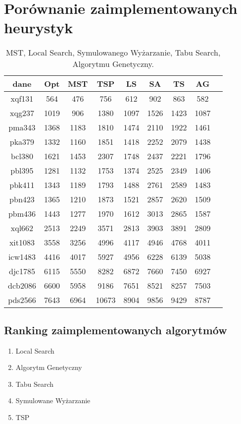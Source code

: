 \documentclass{article}
\begin{document}
\section{Porównanie zaimplementowanych heurystyk}
\begin{table}[h!]
    \centering
    \begin{tabular}{|c|c|c|c|c|c|c|c|c|}
        \hline
        dane & Opt & MST & TSP & LS & SA & TS & AG \\
        \hline
        xqf131 & 564 & 476 & 756 & 612 & 902 & 863 & 582 \\
        \hline
        xqg237 & 1019 & 906 & 1380 & 1097 & 1526 & 1423 & 1087 \\
        \hline
        pma343 & 1368 & 1183 & 1810 & 1474 & 2110 & 1922 & 1461 \\
        \hline
        pka379 & 1332 & 1160 & 1851 & 1418 & 2252 & 2079 & 1438 \\
        \hline
        bcl380 & 1621 & 1453 & 2307 & 1748 & 2437 & 2221 & 1796 \\
        \hline
        pbl395 & 1281 & 1132 & 1753 & 1374 & 2525 & 2349 & 1406 \\
        \hline
        pbk411 & 1343 & 1189 & 1793 & 1488 & 2761 & 2589 & 1483 \\
        \hline
        pbn423 & 1365 & 1210 & 1873 & 1521 & 2857 & 2620 & 1509 \\
        \hline
        pbm436 & 1443 & 1277 & 1970 & 1612 & 3013 & 2865 & 1587 \\
        \hline
        xql662 & 2513 & 2249 & 3571 & 2813 & 3903 & 3891 & 2809 \\
        \hline
        xit1083 & 3558 & 3256 & 4996 & 4117 & 4946 & 4768 & 4011 \\
        \hline
        icw1483 & 4416 & 4017 & 5927 & 4956 & 6228 & 6139 & 5038 \\
        \hline
        djc1785 & 6115 & 5550 & 8282 & 6872 & 7660 & 7450 & 6927 \\
        \hline
        dcb2086 & 6600 & 5958 & 9186 & 7651 & 8521 & 8257 & 7503 \\
        \hline
        pds2566 & 7643 & 6964 & 10673 & 8904 & 9856 & 9429 & 8787 \\
        \hline
    \end{tabular}
    \caption{MST, Local Search, Symulowanego Wyżarzanie, Tabu Search, Algorytmu Genetyczny.}
\end{table}

\subsection{Ranking zaimplementowanych algorytmów}
\begin{enumerate}
    \item Local Search
    \item Algorytm Genetyczny
    \item Tabu Search
    \item Symulowane Wyżarzanie
    \item TSP
\end{enumerate}
\end{document}
